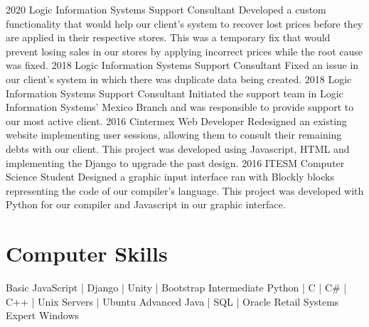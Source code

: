 \documentclass[]{twentysecondcv}
\begin{document}
\begin{twenty}
  \twentyitem
    {2020}
    {Logic Information Systems}
    {Support Consultant}
    {Developed a custom functionality that would help our client’s system to recover lost prices before they are applied in their respective stores. This was a temporary fix that would prevent losing sales in our stores by applying incorrect prices while the root cause was fixed.}
  \twentyitem
    {2018}
    {Logic Information Systems}
    {Support Consultant}
    {Fixed an issue in our client’s system in which there was duplicate data being created.}
  \twentyitem
    {2018}
    {Logic Information Systems}
    {Support Consultant}
    {Initiated the support team in Logic Information Systems’ Mexico Branch and was responsible to provide support to our most active client.}
\twentyitem
    {2016}
    {Cintermex}
    {Web Developer}
    {Redesigned an existing website implementing user sessions, allowing them to consult their remaining debts with our client. This project was developed using Javascript, HTML and implementing the Django to upgrade the past design.}
\twentyitem
    {2016}
    {ITESM}
    {Computer Science Student}
    {Designed a graphic input interface ran with Blockly blocks representing the code of our compiler's language. This project was developed with Python for our compiler and Javascript in our graphic interface.}
\end{twenty}

\section{Computer Skills}

\begin{twentyshort}
  \twentyitemshort
    {Basic}
    {   JavaScript | Django | Unity | Bootstrap}
  \twentyitemshort
    {Intermediate}
    {   Python | C | C\# | C++ | Unix Servers | Ubuntu}
  \twentyitemshort
    {Advanced}
    {   Java | SQL | Oracle Retail Systems}
  \twentyitemshort
    {Expert}
    {   Windows}
\end{twentyshort}


\end{document}
